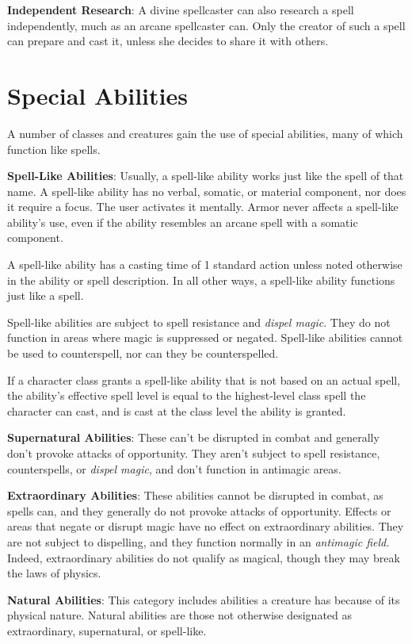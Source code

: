 \textbf{Independent Research}: A divine spellcaster can also research a spell independently, much as an arcane spellcaster can. Only the creator of such a spell can prepare and cast it, unless she decides to share it with others.
				
\section{Special Abilities}

				
A number of classes and creatures gain the use of special abilities, many of which function like spells.
				
\textbf{Spell-Like Abilities}: Usually, a spell-like ability works just like the spell of that name. A spell-like ability has no verbal, somatic, or material component, nor does it require a focus. The user activates it mentally. Armor never affects a spell-like ability's use, even if the ability resembles an arcane spell with a somatic component.
				
A spell-like ability has a casting time of 1 standard action unless noted otherwise in the ability or spell description. In all other ways, a spell-like ability functions just like a spell.
				
Spell-like abilities are subject to spell resistance and \textit{dispel magic}. They do not function in areas where magic is suppressed or negated. Spell-like abilities cannot be used to counterspell, nor can they be counterspelled.
				
If a character class grants a spell-like ability that is not based on an actual spell, the ability's effective spell level is equal to the highest-level class spell the character can cast, and is cast at the class level the ability is granted.
				
\textbf{Supernatural Abilities}: These can't be disrupted in combat and generally don't provoke attacks of opportunity. They aren't subject to spell resistance, counterspells, or \textit{dispel magic}, and don't function in antimagic areas.
				
\textbf{Extraordinary Abilities}: These abilities cannot be disrupted in combat, as spells can, and they generally do not provoke attacks of opportunity. Effects or areas that negate or disrupt magic have no effect on extraordinary abilities. They are not subject to dispelling, and they function normally in an \textit{antimagic field. }Indeed, extraordinary abilities do not qualify as magical, though they may break the laws of physics.
				
\textbf{Natural Abilities}: This category includes abilities a creature has because of its physical nature. Natural abilities are those not otherwise designated as extraordinary, supernatural, or spell-like.
			
        	
